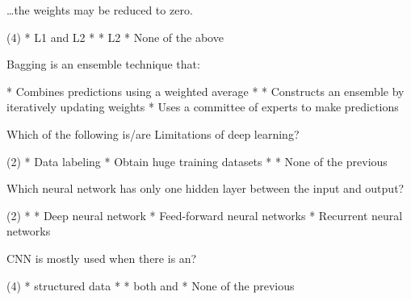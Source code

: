 \documentclass[10pt]{extarticle}
\begin{document}
\begin{exercise}
    \dots the weights may be reduced to zero.
    \begin{choice}(4)
        * L1 and L2
        * 
        * L2
        * None of the above
    \end{choice}
\end{exercise}
\begin{solution}
\end{solution}

\begin{exercise}
    Bagging is an ensemble technique that:
    \begin{choice}
        * Combines predictions using a weighted average
        * 
        * Constructs an ensemble by iteratively updating weights
        * Uses a committee of experts to make predictions
    \end{choice}
\end{exercise}
\begin{solution}
\end{solution}

\begin{exercise}
    Which of the following is/are Limitations of deep learning?
    \begin{choice} (2)
        * Data labeling
        * Obtain huge training datasets
        * 
        * None of the previous
    \end{choice}
\end{exercise}
\begin{solution}
\end{solution}

\begin{exercise}
    Which neural network has only one hidden layer between the input and output?
    \begin{choice} (2)
        * 
        * Deep neural network
        * Feed-forward neural networks
        * Recurrent neural networks
    \end{choice}
\end{exercise}
\begin{solution}
\end{solution}

\begin{exercise}
    CNN is mostly used when there is an?
    \begin{choice} (4)
        * structured data
        * 
        * both  and 
        * None of the previous
    \end{choice}
\end{exercise}
\begin{solution}
\end{solution}
\end{document}
